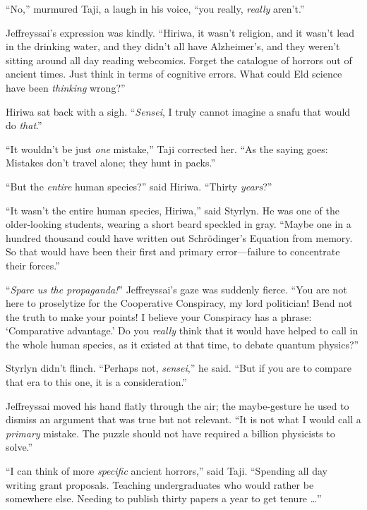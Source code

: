 {
 ``No,'' murmured Taji, a laugh
in his voice, ``you really, \textit{really}
aren't.''}

{
 Jeffreyssai's expression was kindly.
``Hiriwa, it wasn't religion, and it
wasn't lead in the drinking water, and they
didn't all have Alzheimer's, and they
weren't sitting around all day reading webcomics.
Forget the catalogue of horrors out of ancient times. Just think in
terms of cognitive errors. What could Eld science have been
\textit{thinking} wrong?''}

{
 Hiriwa sat back with a sigh. ``\textit{Sensei}, I
truly cannot imagine a snafu that would do
\textit{that}.''}

{
 ``It wouldn't be just
\textit{one} mistake,'' Taji corrected her.
``As the saying goes: Mistakes don't
travel alone; they hunt in packs.''}

{
 ``But the \textit{entire} human
species?'' said Hiriwa. ``Thirty
\textit{years}?''}

{
 ``It wasn't the entire human
species, Hiriwa,'' said Styrlyn. He was one of the
older-looking students, wearing a short beard speckled in gray.
``Maybe one in a hundred thousand could have written
out Schrödinger's Equation from memory. So that would
have been their first and primary error---failure to concentrate their
forces.''}

{
 ``\textit{Spare us the
propaganda!}'' Jeffreyssai's gaze was
suddenly fierce. ``You are not here to proselytize for
the Cooperative Conspiracy, my lord politician! Bend not the truth to
make your points! I believe your Conspiracy has a phrase:
`Comparative advantage.' Do you
\textit{really} think that it would have helped to call in the whole
human species, as it existed at that time, to debate quantum
physics?''}

{
 Styrlyn didn't flinch. ``Perhaps
not, \textit{sensei},'' he said.
``But if you are to compare that era to this one, it
is a consideration.''}

{
 Jeffreyssai moved his hand flatly through the air; the
maybe-gesture he used to dismiss an argument that was true but not
relevant. ``It is not what I would call a
\textit{primary} mistake. The puzzle should not have required a billion
physicists to solve.''}

{
 ``I can think of more \textit{specific} ancient
horrors,'' said Taji. ``Spending all
day writing grant proposals. Teaching undergraduates who would rather
be somewhere else. Needing to publish thirty papers a year to get
tenure \ldots''}

